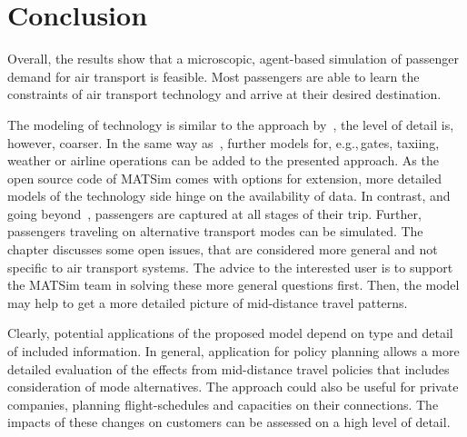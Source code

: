 \section{Conclusion}
Overall, the results show that a microscopic, agent-based simulation of passenger demand for air transport is feasible. 
Most passengers are able to learn the constraints of air transport technology and arrive at their desired destination.

The modeling of technology is similar to the approach by~\citet{ClarkeEtAl2007AirNetworkSim}, the level of detail is, however, coarser. 
In the same way as~\citet{ClarkeEtAl2007AirNetworkSim}, further models for, e.g.,\,gates, taxiing, weather or airline operations can be added to the presented approach. 
As the open source code of MATSim comes with options for extension, more detailed models of the technology side hinge on the availability of data. 
In contrast, and going beyond~\citet{ClarkeEtAl2007AirNetworkSim}, passengers are captured at all stages of their trip. 
Further, passengers traveling on alternative transport modes can be simulated. 
The chapter discusses some open issues, that are considered more general and not specific to air transport systems. 
The advice to the interested user is to support the MATSim team in solving these more general questions first.  
Then, the model may help to get a more detailed picture of mid-distance travel patterns.

Clearly, potential applications of the proposed model depend on type and detail of included information. 
In general, application for policy planning allows a more detailed evaluation of the effects from mid-distance travel policies that includes consideration of mode alternatives. 
The approach could also be useful for private companies, planning flight-schedules and capacities on their connections. 
The impacts of these changes on customers can be assessed on a high level of detail. 


